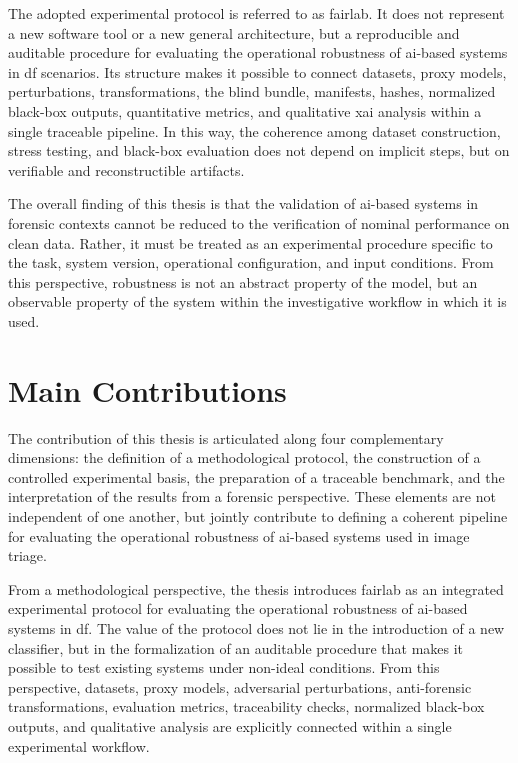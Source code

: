 The adopted experimental protocol is referred to as \gls{fairlab}. It does not
represent a new software tool or a new general architecture, but a reproducible
and auditable procedure for evaluating the operational robustness of
\gls{ai}-based systems in \gls{df} scenarios. Its structure makes it possible
to connect datasets, proxy models, perturbations, transformations, the blind
bundle, manifests, hashes, normalized black-box outputs, quantitative metrics,
and qualitative \gls{xai} analysis within a single traceable pipeline. In this
way, the coherence among dataset construction, stress testing, and black-box
evaluation does not depend on implicit steps, but on verifiable and
reconstructible artifacts.

The overall finding of this thesis is that the validation of \gls{ai}-based
systems in forensic contexts cannot be reduced to the verification of nominal
performance on clean data. Rather, it must be treated as an experimental
procedure specific to the task, system version, operational configuration, and
input conditions. From this perspective, robustness is not an abstract property
of the model, but an observable property of the system within the investigative
workflow in which it is used.

\section{Main Contributions}
\label{sec:conclusions-contributions}

The contribution of this thesis is articulated along four complementary
dimensions: the definition of a methodological protocol, the construction of a
controlled experimental basis, the preparation of a traceable benchmark, and the
interpretation of the results from a forensic perspective. These elements are
not independent of one another, but jointly contribute to defining a coherent
pipeline for evaluating the operational robustness of \gls{ai}-based systems
used in image triage.

From a methodological perspective, the thesis introduces \gls{fairlab} as an
integrated experimental protocol for evaluating the operational robustness of
\gls{ai}-based systems in \gls{df}. The value of the protocol does not lie in
the introduction of a new classifier, but in the formalization of an auditable
procedure that makes it possible to test existing systems under non-ideal
conditions. From this perspective, datasets, proxy models, adversarial
perturbations, anti-forensic transformations, evaluation metrics, traceability
checks, normalized black-box outputs, and qualitative analysis are explicitly
connected within a single experimental workflow.

